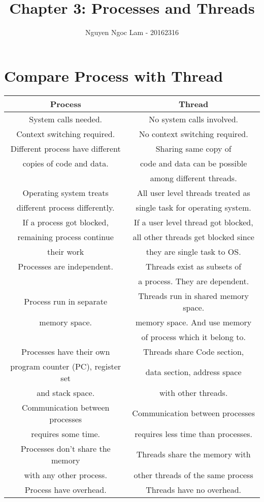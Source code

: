 \documentclass[11pt,a4paper]{article}
\title{Chapter 3: Processes and Threads}
\date{\displaydate{date}}
\author{Nguyen Ngoc Lam - 20162316}
\begin{document}
  	\maketitle
  	\newpage
  	\tableofcontents
  	\newpage
  	
  	\section{Compare Process with Thread}
  	\begin{tabular}{|c|c|}
  	\hline 
  	\textbf{Process} & \textbf{Thread} \\ 
  	\hline 
  	System calls needed. & No system calls involved. \\ 
  	\hline 
  	Context switching required. & No context switching required. \\ 
  	\hline 
  	Different process have different  & Sharing same copy of \\ copies of code and data. & code and data can be possible \\ & among different threads. \\
  	\hline 
  	Operating system treats &  All user level threads treated as \\different process differently. & single task for operating system. \\ 
  	\hline 
  	If a process got blocked,  & If a user level thread got blocked, \\ remaining process continue & all other threads get blocked since \\their work & they are single task to OS. \\ 
  	\hline 
  	Processes are independent. & Threads exist as subsets of  \\ &a process. They are dependent. \\ 
  	\hline 
  	Process run in separate  & Threads run in shared memory space.\\ memory space. & memory space. And use memory  \\ & of process which it belong to.\\ 
  	\hline 
  	Processes have their own & Threads share Code section, \\ program counter (PC), register set& data section, address space \\  and stack space. & with other threads.\\
  	\hline 
  	 Communication between processes  & Communication between processes \\ requires some time. &requires less time than processes. \\ 
  	\hline 
  	Processes don’t share the memory & Threads share the memory with\\with any other process. & other threads of the same process \\ 
  	\hline 
  	Process have overhead. & Threads have no overhead. \\ 
  	\hline 
  	\end{tabular}
  	
\end{document}
